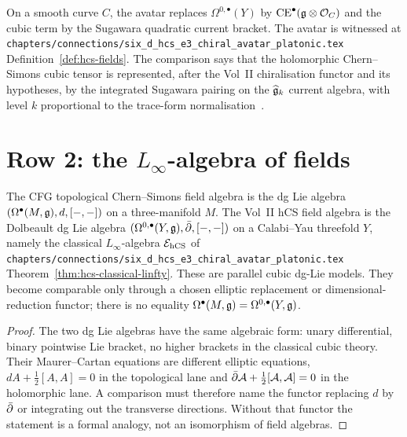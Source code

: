 \begin{remark}
\label{rem:cfg-row-1-avatar}
On a smooth curve $C$, the avatar replaces $\Omega^{0,\bullet}(Y)$ by
$\mathrm{CE}^\bullet(\mathfrak{g}\otimes\mathcal{O}_C)$ and the cubic term by the Sugawara
quadratic current bracket. The avatar is witnessed at
\texttt{chapters/connections/six\_d\_hcs\_e3\_chiral\_avatar\_platonic.tex}
Definition~\ref{def:hcs-fields}. The comparison says that the
holomorphic Chern--Simons cubic tensor is represented, after the
Vol~II chiralisation functor and its hypotheses, by the integrated
Sugawara pairing on the $\widehat{\mathfrak{g}}_k$ current algebra, with level
$k$ proportional to the trace-form normalisation~\cite{CostelloYangian}.
\end{remark}

\section{\texorpdfstring{Row 2: the $L_\infty$-algebra of fields}{Row 2: the L-infinity algebra of fields}}
\label{sec:cfg-row-2-linfty}

\begin{theorem}
\label{thm:cfg-row-2}
The CFG topological Chern--Simons field algebra is the dg Lie algebra
$(\Omega^\bullet(M,\mathfrak{g}),d,[-,-])$ on a three-manifold $M$. The Vol~II
hCS field algebra is the Dolbeault dg Lie algebra
$(\Omega^{0,\bullet}(Y,\mathfrak{g}),\bar\partial,[-,-])$ on a Calabi--Yau threefold $Y$, namely
the classical $L_\infty$-algebra $\mathcal{E}_{\mathrm{hCS}}$ of
\texttt{chapters/connections/six\_d\_hcs\_e3\_chiral\_avatar\_platonic.tex}
Theorem~\ref{thm:hcs-classical-linfty}. These are parallel cubic
dg-Lie models. They become comparable only through a chosen elliptic
replacement or dimensional-reduction functor; there is no equality
$\Omega^\bullet(M,\mathfrak{g})=\Omega^{0,\bullet}(Y,\mathfrak{g})$.
\end{theorem}

\begin{proof}
The two dg Lie algebras have the same algebraic form: unary
differential, binary pointwise Lie bracket, no higher brackets in the
classical cubic theory. Their Maurer--Cartan equations are different
elliptic equations, $dA+\tfrac12[A,A]=0$ in the topological lane and
$\bar\partial\mathcal{A}+\tfrac12[\mathcal{A},\mathcal{A}]=0$ in the holomorphic lane. A comparison
must therefore name the functor replacing $d$ by $\bar\partial$ or integrating
out the transverse directions. Without that functor the statement is a
formal analogy, not an isomorphism of field algebras.
\end{proof}


